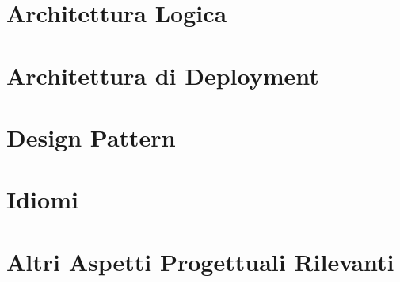 \documentclass[a4paper, 12pt]{article}
\begin{document}
\newpage
\section{Architettura Logica}

\newpage
\section{Architettura di Deployment}

\newpage
\section{Design Pattern}

\newpage
\section{Idiomi}

\newpage
\section{Altri Aspetti Progettuali Rilevanti}
\end{document}

